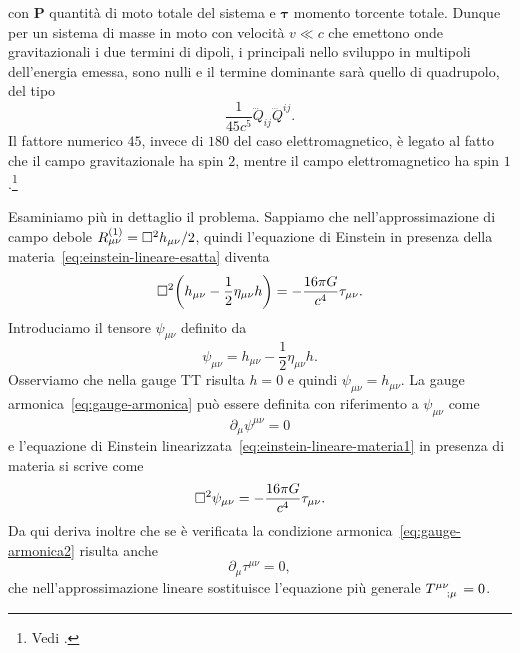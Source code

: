 con $\bm{P}$ quantità di moto totale del sistema e $\bm{\tau}$ momento torcente
totale.  Dunque per un sistema di masse in moto con velocità $v \ll c$ che
emettono onde gravitazionali i due termini di dipoli, i principali nello
sviluppo in multipoli dell'energia emessa, sono nulli e il termine dominante
sarà quello di quadrupolo, del tipo
\begin{equation}
  \frac{1}{45c^{5}}\dddot{Q}_{ij}\dddot{Q}^{ij}.
\end{equation}
Il fattore numerico $45$, invece di $180$ del caso elettromagnetico, è legato al
fatto che il campo gravitazionale ha spin $2$, mentre il campo elettromagnetico
ha spin $1$.\footnote{Vedi \textcite[471]{shapiro:black-holes}.}

Esaminiamo più in dettaglio il problema.  Sappiamo che nell'approssimazione di
campo debole $R_{\mu\nu}^{(1)} = \Box^{2} h_{\mu\nu}/2$, quindi l'equazione di
Einstein in presenza della materia~\eqref{eq:einstein-lineare-esatta} diventa
\begin{equation}
  \label{eq:einstein-lineare-materia1}
  \Box^{2} \bigg(h_{\mu\nu} - \frac{1}{2} \eta_{\mu\nu}h \bigg) = -\frac{16\pi
    G}{c^{4}} \tau_{\mu\nu}.
\end{equation}
Introduciamo il tensore $\psi_{\mu\nu}$ definito da
\begin{equation}
  \psi_{\mu\nu} = h_{\mu\nu} - \frac{1}{2} \eta_{\mu\nu} h.
\end{equation}
Osserviamo che nella gauge TT risulta $h = 0$ e quindi
$\psi_{\mu\nu} = h_{\mu\nu}$.  La gauge armonica~\eqref{eq:gauge-armonica} può
essere definita con riferimento a $\psi_{\mu\nu}$ come
\begin{equation}
  \label{eq:gauge-armonica2}
  \partial_{\mu}\psi^{\mu\nu} = 0
\end{equation}
e l'equazione di Einstein linearizzata~\eqref{eq:einstein-lineare-materia1} in
presenza di materia si scrive come
\begin{equation}
  \label{eq:einstein-lineare-materia2}
  \Box^{2} \psi_{\mu\nu} = -\frac{16\pi G}{c^{4}} \tau_{\mu\nu}.
\end{equation}
Da qui deriva inoltre che se è verificata la condizione
armonica~\eqref{eq:gauge-armonica2} risulta anche
\begin{equation}
  \label{eq:gauge-armonica-tau}
  \partial_{\mu}\tau^{\mu\nu} = 0,
\end{equation}
che nell'approssimazione lineare sostituisce l'equazione più generale
$\tensor{T}{^{\mu\nu}_{;\mu}} = 0$.

